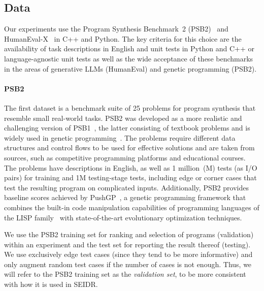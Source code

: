 \newpage\subsection{Data}
\label{sec:seidr-data}

Our experiments use the Program Synthesis Benchmark~2 (PSB2)~\cite{helmuth2022:applying} and HumanEval-X~\cite{zheng2023:codegeex} in C++ and Python. 
The key criteria for this choice are the availability of task descriptions in English and unit tests in Python and C++ or language-agnostic unit tests as well as the wide acceptance of these benchmarks in the areas of generative LLMs (HumanEval) and genetic programming (PSB2). 

\paragraph{PSB2}
The first dataset is a benchmark suite of 25 problems for program synthesis that resemble small real-world tasks. 
PSB2 was developed as a more realistic and challenging version of PSB1~\cite{helmuth2015:general}, the latter consisting of textbook problems and is widely used in genetic programming~\cite{sobania2022:choose}. 
The problems require different data structures and control flows to be used for effective solutions and are taken from sources, such as competitive programming platforms and educational courses. 
The problems have descriptions in English, as well as 1 million~(M) tests (as I/O pairs) for training and 1M testing-stage tests, including edge or corner cases that test the resulting program on complicated inputs. 
Additionally, PSB2 provides baseline scores achieved by PushGP~\cite{spectorAutoconstructiveEvolutionPush2001}, a genetic programming framework that combines the built-in code manipulation capabilities of programming languages of the LISP family~\cite{b.HowStrengthsLispfamily2016a, c.LispSmallPieces2003, e.SyntacticExtensionsProgramming1986a, grahamHundredYearLanguage, j.RecursiveFunctionsSymbolic1960a} with state-of-the-art evolutionary optimization techniques.

We use the PSB2 training set for ranking and selection of programs (validation) within an experiment and the test set for reporting the result thereof (testing).
We use exclusively edge test cases (since they tend to be more informative) and only augment random test cases if the number of cases is not enough.
Thus, we will refer to the PSB2 training set as the \emph{validation set}, to be more consistent with how it is used in SEIDR.

